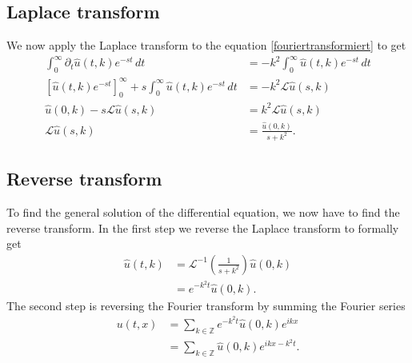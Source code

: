 \subsection{Laplace transform}
We now apply the Laplace transform to the equation
\eqref{fouriertransformiert}
to get
\begin{align*}
\int_0^{\infty} \partial_t \hat u(t,k)e^{-st}\,dt
&=
-k^2\int_0^{\infty}\hat u(t,k)e^{-st}\,dt
\\
\left[\hat u(t,k)e^{-st}\right]_0^{\infty}
+
s\int_0^{\infty}\hat u(t,k)e^{-st}\,dt
&=
-k^2\mathscr{L}\hat u(s,k)
\\
\hat u(0,k)-s\mathscr{L}\hat u(s,k)&=k^2\mathscr{L}\hat u(s,k)
\\
\mathscr{L}\hat u(s,k)&=\frac{\hat u(0,k)}{s+k^2}.
\end{align*}

\subsection{Reverse transform}
To find the general solution of the differential equation, 
we now have to find the reverse transform.
In the first step we reverse the Laplace transform to
formally get
\begin{align*}
\hat u(t,k)&=\mathscr{L}^{-1}\left(\frac1{s+k^2}\right)\hat u(0,k)
\\
&=e^{-k^2t}\hat u(0,k).
\end{align*}
The second step is reversing the Fourier transform by summing the
Fourier series
\begin{align*}
u(t,x)&=\sum_{k\in\mathbb Z}e^{-k^2t}\hat u(0,k)e^{ikx}
\\
&=\sum_{k\in\mathbb Z}\hat u(0,k)e^{ikx-k^2t}.
\end{align*}

